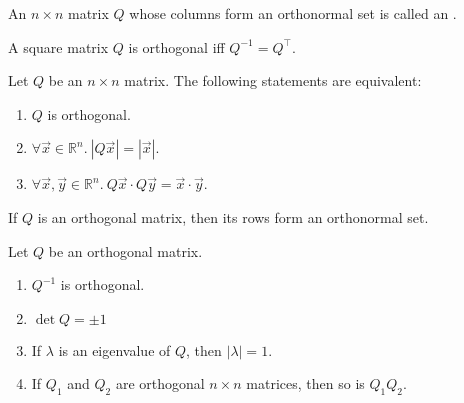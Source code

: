 \documentclass{article}
\begin{document}
\begin{definition}
    An $n \times n$ matrix $Q$ whose columns form an orthonormal set is called an \linebreak {}.
\end{definition}
\begin{theorem}
    A square matrix $Q$ is orthogonal iff $Q^{-1}=Q^\intercal $.
\end{theorem}
\begin{theorem}
    Let $Q$ be an $n\times n$ matrix. The following statements are equivalent:
    \begin{enumerate}
        \item $Q$ is orthogonal.
        \item $\forall \vec x \in \mathbb{R}^n.\:|Q\vec x| = |\vec x|$.
        \item $\forall \vec x, \vec y \in \mathbb{R}^n.\:Q\vec x\cdot Q\vec y = \vec x\cdot \vec y$.
    \end{enumerate}
\end{theorem}
\begin{theorem}
    If $Q$ is an orthogonal matrix, then its rows form an orthonormal set.
\end{theorem}
\begin{theorem}
    Let $Q$ be an orthogonal matrix.
    \begin{enumerate}
        \item $Q^{-1}$ is orthogonal.
        \item $\det Q = \pm 1$
        \item If $\lambda$ is an eigenvalue of $Q$, then $|\lambda|=1$.
        \item If $Q_1$ and $Q_2$ are orthogonal $n\times n$ matrices, then so is $Q_1Q_2$.
    \end{enumerate}
\end{theorem}
\end{document}
